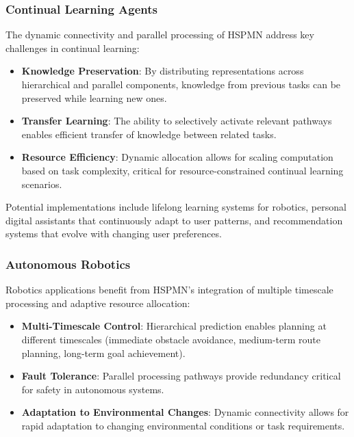 \documentclass[11pt,a4paper,twocolumn]{article}
\begin{document}
\subsubsection{Continual Learning Agents}

The dynamic connectivity and parallel processing of HSPMN address key challenges in continual learning:

\begin{itemize}
    \item \textbf{Knowledge Preservation}: By distributing representations across hierarchical and parallel components, knowledge from previous tasks can be preserved while learning new ones.
    \item \textbf{Transfer Learning}: The ability to selectively activate relevant pathways enables efficient transfer of knowledge between related tasks.
    \item \textbf{Resource Efficiency}: Dynamic allocation allows for scaling computation based on task complexity, critical for resource-constrained continual learning scenarios.
\end{itemize}

Potential implementations include lifelong learning systems for robotics, personal digital assistants that continuously adapt to user patterns, and recommendation systems that evolve with changing user preferences.

\subsubsection{Autonomous Robotics}

Robotics applications benefit from HSPMN's integration of multiple timescale processing and adaptive resource allocation:

\begin{itemize}
    \item \textbf{Multi-Timescale Control}: Hierarchical prediction enables planning at different timescales (immediate obstacle avoidance, medium-term route planning, long-term goal achievement).
    \item \textbf{Fault Tolerance}: Parallel processing pathways provide redundancy critical for safety in autonomous systems.
    \item \textbf{Adaptation to Environmental Changes}: Dynamic connectivity allows for rapid adaptation to changing environmental conditions or task requirements.
\end{itemize}
\end{document}
